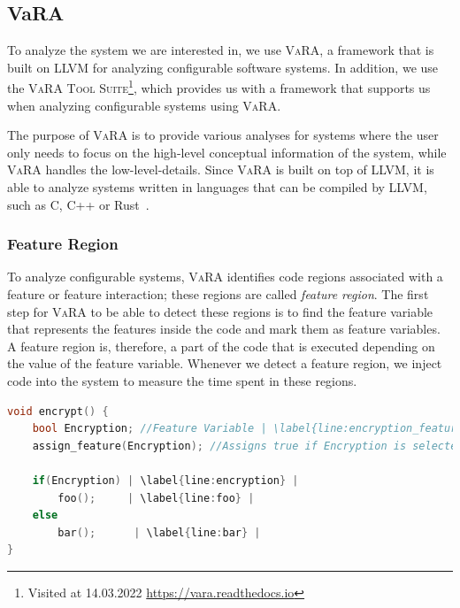\subsection{VaRA}\label{VaRA}
To analyze the system we are interested in, we use \textsc{VaRA}, a framework that is built on \textsc{LLVM} for analyzing configurable software systems.
In addition, we use the \textsc{VaRA Tool Suite}\footnote{Visited at 14.03.2022 \url{https://vara.readthedocs.io}}, which provides us with a framework that supports
us when analyzing configurable systems using \textsc{VaRA}.
    
The purpose of \textsc{VaRA} is to provide various analyses for systems where the user only needs to focus on the high-level conceptual information of the 
system, while \textsc{VaRA} handles the low-level-details. 
Since \textsc{VaRA} is built on top of \textsc{LLVM}, it is able to analyze systems written in languages that can be compiled by \textsc{LLVM}, such as C, C++ or Rust~\cite{VaRA-Flo}.

\subsubsection{Feature Region}
To analyze configurable systems, \textsc{VaRA} identifies code regions associated with a feature or feature interaction; 
these regions are called \emph{feature region}. 
The first step for \textsc{VaRA} to be able to detect these regions is to find the feature variable that represents the features inside the code and mark them as
feature variables. 
A feature region is, therefore, a part of the code that is executed depending on the value of the feature variable. Whenever we detect a feature region,
we inject code into the system to measure the time spent in these regions.

\lstset{style=myStyle}
\begin{minipage}{\linewidth}
\begin{lstlisting}[caption={Feature region example},language=C++,label={alg:Vara_feature_regions},escapechar=|]
void encrypt() {
    bool Encryption; //Feature Variable | \label{line:encryption_feature_variable} |
    assign_feature(Encryption); //Assigns true if Encryption is selected
    
    if(Encryption) | \label{line:encryption} |
        foo();     | \label{line:foo} |
    else
        bar();      | \label{line:bar} |
}
\end{lstlisting}
\end{minipage}

